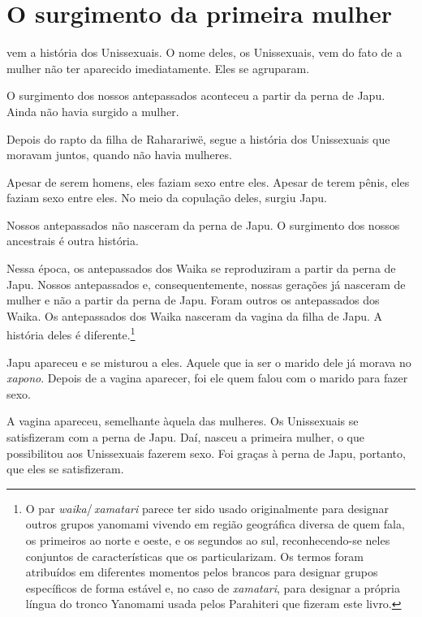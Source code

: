 \chapter{O surgimento da primeira mulher}
 
 vem a história dos Unissexuais. O nome deles, os Unissexuais, vem
do fato de a mulher não ter aparecido imediatamente. Eles se agruparam. 

O surgimento dos nossos antepassados aconteceu a partir da perna de
Japu. Ainda não havia surgido a mulher. 

Depois do rapto da filha de Raharariwë, segue a história dos Unissexuais
que moravam juntos, quando não havia mulheres. 

Apesar de serem homens, eles faziam sexo entre eles. Apesar de terem
pênis, eles faziam sexo entre eles. No meio da copulação
deles, surgiu Japu.


Nossos antepassados não nasceram da perna de Japu. O surgimento dos
nossos ancestrais é outra história. 

Nessa época, os antepassados dos Waika se reproduziram a partir da
perna de Japu. Nossos antepassados e, consequentemente, nossas gerações
já nasceram de mulher e não a partir da perna de Japu. Foram outros
os antepassados dos Waika. Os antepassados dos Waika nasceram da vagina da
filha de Japu. A história deles é diferente.\footnote{O par \textit{waika}/\,\textit{xamatari} parece ter sido usado originalmente para designar outros grupos yanomami vivendo em região geográfica diversa de quem fala, os primeiros ao norte e oeste, e os segundos ao sul, reconhecendo-se neles conjuntos de características que os particularizam. Os termos foram atribuídos em diferentes momentos pelos brancos para designar grupos específicos de forma estável e, no caso de \textit{xamatari}, para designar a própria língua do tronco Yanomami usada pelos Parahiteri que fizeram este livro.} 

Japu apareceu e se misturou a eles. Aquele que ia ser o marido
dele já morava no \textit{xapono}. Depois de a vagina aparecer, foi ele quem
falou com o marido para fazer sexo. 

A vagina apareceu, semelhante àquela das mulheres. Os Unissexuais se
 satisfizeram com a perna de Japu. Daí, nasceu a primeira mulher, o que
 possibilitou aos Unissexuais fazerem sexo. Foi graças à perna de Japu, portanto,
 que eles se satisfizeram. 

